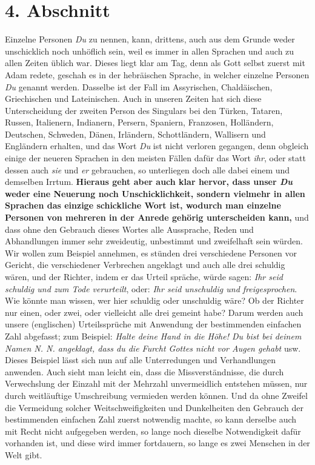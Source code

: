 \section{4. Abschnitt} \label{kap10_ab4}

Einzelne Personen \textit{Du} zu nennen, kann, drittens, auch aus dem Grunde
weder
unschicklich noch unhöflich sein, weil es immer in allen Sprachen und auch zu
allen Zeiten üblich war. Dieses liegt klar am Tag, denn als Gott selbst zuerst
mit Adam redete, geschah es in der hebräischen Sprache, in welcher einzelne
Personen \textit{Du} genannt werden. Dasselbe ist der Fall im
Assyrischen,
Chaldäischen, Griechischen
und Lateinischen. Auch in unseren Zeiten hat sich
diese Unterscheidung der zweiten Person des Singulars bei den
Türken, Tataren,
Russen, Italienern,
Indianern, Persern,
Spaniern, Franzosen,
Holländern,
Deutschen, Schweden,
Dänen, Irländern,
Schottländern, Wallisern
und Engländern erhalten, und das Wort \textit{Du}
ist nicht verloren gegangen,
denn obgleich einige der neueren Sprachen in den meisten Fällen dafür das Wort
\textit{ihr}, oder statt dessen auch \textit{sie} und \textit{er} gebrauchen, so
unterliegen
doch alle dabei einem und demselben Irrtum. \textbf{Hieraus geht aber auch
klar
hervor, dass unser \textit{Du} weder eine Neuerung noch Unschicklichkeit,
sondern
vielmehr in allen Sprachen das einzige schickliche Wort ist, wodurch man
einzelne Personen von mehreren in der Anrede gehörig unterscheiden kann,} und
dass
ohne den Gebrauch dieses Wortes alle Aussprache, Reden und Abhandlungen immer
sehr zweideutig, unbestimmt und zweifelhaft sein würden. Wir wollen zum Beispiel
annehmen, es stünden drei verschiedene Personen vor Gericht, die verschiedener
Verbrechen angeklagt und auch alle drei schuldig wären, und der Richter, indem
er das Urteil spräche, würde sagen: \textit{Ihr seid schuldig und zum Tode
verurteilt},
oder: \textit{Ihr seid unschuldig und freigesprochen}. Wie könnte man wissen,
wer hier
schuldig oder unschuldig wäre? Ob der Richter nur einen, oder zwei, oder
vielleicht alle drei gemeint habe? Darum werden auch unsere (englischen)
Urteilssprüche mit Anwendung der bestimmenden einfachen Zahl abgefasst; zum Beispiel:
\textit{Halte deine Hand in die Höhe! Du bist bei deinem Namen N. N. angeklagt,
dass du
die Furcht Gottes nicht vor Augen gehabt} usw. Dieses Beispiel lässt sich nun
auf alle Unterredungen und Verhandlungen anwenden. Auch sieht man leicht ein,
dass die Missverständnisse, die durch Verwechslung der Einzahl mit der Mehrzahl
unvermeidlich entstehen müssen, nur durch weitläuftige Umschreibung vermieden
werden können. Und da ohne Zweifel die Vermeidung solcher Weitschweifigkeiten
und Dunkelheiten den Gebrauch der bestimmenden einfachen Zahl zuerst notwendig
machte, so kann derselbe auch mit Recht nicht aufgegeben werden, so lange noch
dieselbe Notwendigkeit dafür vorhanden ist, und diese wird immer fortdauern, so
lange es zwei Menschen in der Welt gibt.

